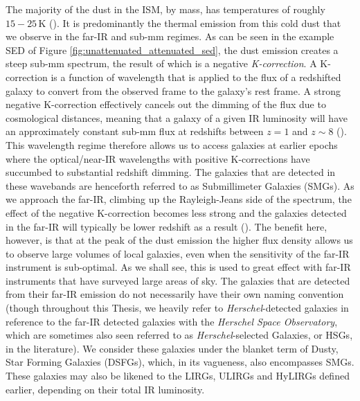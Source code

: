 The majority of the dust in the ISM, by mass, has temperatures of roughly $15 - 25\,$K (\citealt{daCunha_2008}). It is predominantly the thermal emission from this cold dust that we observe in the far-IR and sub-mm regimes. As can be seen in the example SED of Figure \ref{fig:unattenuated_attenuated_sed}, the dust emission creates a steep sub-mm spectrum, the result of which is a negative \textit{K-correction}. A K-correction is a function of wavelength that is applied to the flux of a redshifted galaxy to convert from the observed frame to the galaxy's rest frame. A strong negative K-correction effectively cancels out the dimming of the flux due to cosmological distances, meaning that a galaxy of a given IR luminosity will have an approximately constant sub-mm flux at redshifts between $z = 1$ and $z\sim8$ (\citealt{Casey_2014b}). This wavelength regime therefore allows us to access galaxies at earlier epochs where the optical/near-IR wavelengths with positive K-corrections have succumbed to substantial redshift dimming. The galaxies that are detected in these wavebands are henceforth referred to as Submillimeter Galaxies (SMGs). As we approach the far-IR, climbing up the Rayleigh-Jeans side of the spectrum, the effect of the negative K-correction becomes less strong and the galaxies detected in the far-IR will typically be lower redshift as a result (\citealt{Casey_2014b, Bethermin_2015b, Zavala_2021}). The benefit here, however, is that at the peak of the dust emission the higher flux density allows us to observe large volumes of local galaxies, even when the sensitivity of the far-IR instrument is sub-optimal. As we shall see, this is used to great effect with far-IR instruments that have surveyed large areas of sky. The galaxies that are detected from their far-IR emission do not necessarily have their own naming convention (though throughout this Thesis, we heavily refer to \textit{Herschel}-detected galaxies in reference to the far-IR detected galaxies with the \textit{Herschel Space Observatory}, which are sometimes also seen referred to as \textit{Herschel}-selected Galaxies, or HSGs, in the literature). We consider these galaxies under the blanket term of Dusty, Star Forming Galaxies (DSFGs), which, in its vagueness, also encompasses SMGs. These galaxies may also be likened to the LIRGs, ULIRGs and HyLIRGs defined earlier, depending on their total IR luminosity.

